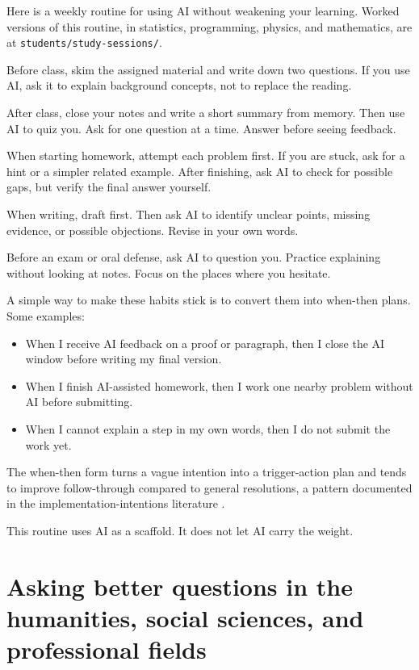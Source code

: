 \documentclass{SIAMbook2023}
\begin{document}
Here is a weekly routine for using AI without weakening your learning. Worked versions of this routine, in statistics, programming, physics, and mathematics, are at \texttt{students/study-sessions/}.

Before class, skim the assigned material and write down two questions. If you use AI, ask it to explain background concepts, not to replace the reading.

After class, close your notes and write a short summary from memory. Then use AI to quiz you. Ask for one question at a time. Answer before seeing feedback.

When starting homework, attempt each problem first. If you are stuck, ask for a hint or a simpler related example. After finishing, ask AI to check for possible gaps, but verify the final answer yourself.

When writing, draft first. Then ask AI to identify unclear points, missing evidence, or possible objections. Revise in your own words.

Before an exam or oral defense, ask AI to question you. Practice explaining without looking at notes. Focus on the places where you hesitate.

A simple way to make these habits stick is to convert them into when-then plans. Some examples:

\begin{itemize}
\item When I receive AI feedback on a proof or paragraph, then I close the AI window before writing my final version.
\item When I finish AI-assisted homework, then I work one nearby problem without AI before submitting.
\item When I cannot explain a step in my own words, then I do not submit the work yet.
\end{itemize}

The when-then form turns a vague intention into a trigger-action plan and tends to improve follow-through compared to general resolutions, a pattern documented in the implementation-intentions literature \citep{gollwitzer1999implementation}.

This routine uses AI as a scaffold. It does not let AI carry the weight.

\section{Asking better questions in the humanities, social sciences, and professional fields}
\label{sec:better-questions-nonstem}%
\end{document}
